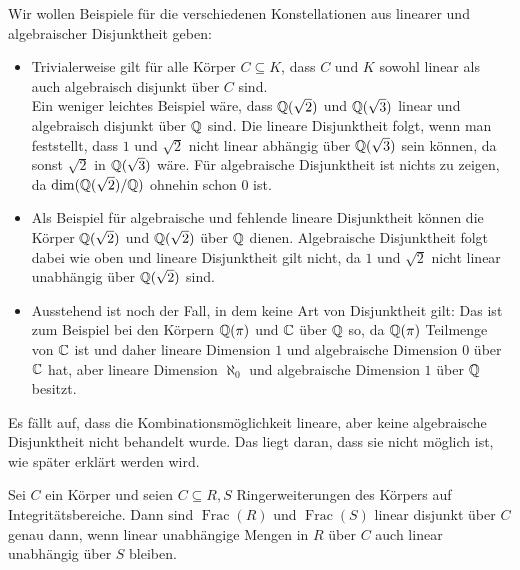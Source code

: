     \begin{example}
    	Wir wollen Beispiele für die verschiedenen Konstellationen aus linearer und algebraischer Disjunktheit geben: 
    	\begin{itemize}
    		\item Trivialerweise gilt für alle Körper $C\subseteq K$, dass $C$ und $K$ sowohl linear als auch algebraisch disjunkt über $C$ sind.\\
    		Ein weniger leichtes Beispiel wäre, dass $\mathbb{Q}(\sqrt{2})$ und $\mathbb{Q}(\sqrt{3})$ linear und algebraisch disjunkt über $\mathbb{Q}$ sind. Die lineare Disjunktheit folgt, wenn man feststellt, dass $1$ und $\sqrt{2}$ nicht linear abhängig über $\mathbb{Q}(\sqrt{3})$ sein können, da sonst $\sqrt{2}$ in $\mathbb{Q}(\sqrt{3})$ wäre. Für algebraische Disjunktheit ist nichts zu zeigen, da $\dim(\mathbb{Q}(\sqrt{2})/\mathbb{Q})$ ohnehin schon $0$ ist.
    		\item Als Beispiel für algebraische und fehlende lineare Disjunktheit können die Körper $\mathbb{Q}(\sqrt{2})$ und $\mathbb{Q}(\sqrt{2})$ über $\mathbb{Q}$ dienen. Algebraische Disjunktheit folgt dabei wie oben und lineare Disjunktheit gilt nicht, da $1$ und $\sqrt{2}$ nicht linear unabhängig über $\mathbb{Q}(\sqrt{2})$ sind.
    		\item Ausstehend ist noch der Fall, in dem keine Art von Disjunktheit gilt: Das ist zum Beispiel bei den Körpern $\mathbb{Q}(\pi)$ und $\mathbb{C}$ über $\mathbb{Q}$ so, da $\mathbb{Q}(\pi)$ Teilmenge von $\mathbb{C}$ ist und daher lineare Dimension $1$ und algebraische Dimension $0$ über $\mathbb{C}$ hat, aber lineare Dimension $\aleph_0$ und algebraische Dimension $1$ über $\mathbb{Q}$ besitzt.
    	\end{itemize}
        Es fällt auf, dass die Kombinationsmöglichkeit \glqq{}lineare, aber keine algebraische Disjunktheit\grqq{} nicht behandelt wurde. Das liegt daran, dass sie nicht möglich ist, wie später erklärt werden wird.
    \end{example}
    \newpage
    \begin{lemma}\label{Fraktionskörper}
    	Sei $C$ ein Körper und seien $C\subseteq R,S$ Ringerweiterungen des Körpers auf Integritätsbereiche. Dann sind $\operatorname{Frac}(R)$ und $\operatorname{Frac}(S)$ linear disjunkt über $C$ genau dann, wenn linear unabhängige Mengen in $R$ über $C$ auch linear unabhängig über $S$ bleiben.
    \end{lemma}
